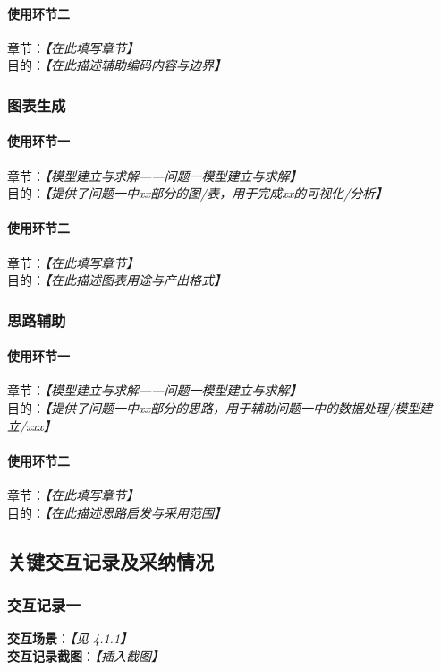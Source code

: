 \documentclass[12pt]{ctexart}
\newcommand{\ph}[1]{\textit{【#1】}}
\begin{document}
\paragraph{使用环节二}
章节：\ph{在此填写章节} \\
目的：\ph{在此描述辅助编码内容与边界}

\subsubsection{图表生成}
\paragraph{使用环节一}
章节：\ph{模型建立与求解——问题一模型建立与求解} \\
目的：\ph{提供了问题一中xx部分的图/表，用于完成xx的可视化/分析}

\paragraph{使用环节二}
章节：\ph{在此填写章节} \\
目的：\ph{在此描述图表用途与产出格式}

\subsubsection{思路辅助}
\paragraph{使用环节一}
章节：\ph{模型建立与求解——问题一模型建立与求解} \\
目的：\ph{提供了问题一中xx部分的思路，用于辅助问题一中的数据处理/模型建立/xxx}

\paragraph{使用环节二}
章节：\ph{在此填写章节} \\
目的：\ph{在此描述思路启发与采用范围}

\subsection{关键交互记录及采纳情况}
\subsubsection{交互记录一}
\textbf{交互场景}：\ph{见 4.1.1} \\[4pt]
\textbf{交互记录截图}：\ph{插入截图}
\end{document}

